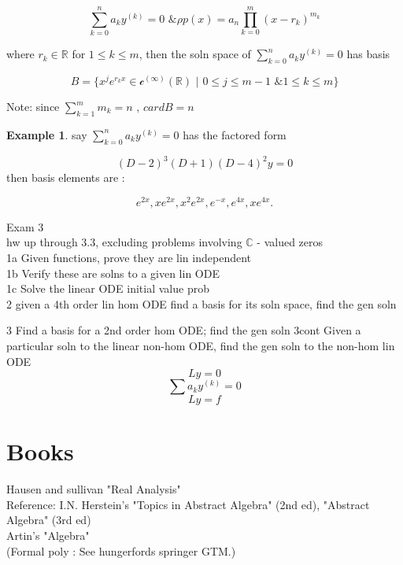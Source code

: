 \documentclass{article}
\theoremstyle{definition}
\newtheorem*{example}{Example}
\begin{document}
\[ \sum_{k=0}^{n}a_ky^{(k)} = 0 \text{ \& } \rho p(x) = a_n
\prod_{k=0}^m (x-r_k)^{m_k} \]

where \( r_k \in \mathbb{R} \) for \( 1 \leq k \leq m \), then the soln
space of \( \sum_{k=0}^{n} a_k y^{(k)} = 0 \) has basis 

\[ B = \{ x^j e^{r_kx} \in \mathscr{c}^{(\infty)} ( \mathbb{R})
\text{ | } 0 \leq j \leq m-1 \text{ \& } 1  \leq k \leq m \}\]

Note: since \( \sum_{k=1}^{m} m_k = n \text{ , } cardB=n \)

\begin{example}
  say \( \sum_{k=0}^{n}a_ky^{(k)} = 0 \) has the factored form 

  \[ (D-2)^3(D+1)(D-4)^2y= 0 \]
  then basis elements are : 

  \[ e^{2x}, xe^{2x}, x^2e^{2x}, e^{-x}, e^{4x}, xe^{4x}. \]

\end{example}

Exam 3\\ 
hw up through 3.3, excluding problems involving  \( \mathbb{C}  \) -
valued zeros \\

1a Given functions, prove they are lin independent\\ 
1b Verify these are solns to a given lin ODE \\ 
1c Solve the linear ODE  initial value prob \\

2 given a 4th order lin hom ODE find a basis for its soln space, find the
gen soln

3 Find a basis for a 2nd order hom ODE; find the gen soln 
3cont Given a particular soln to the linear non-hom ODE, find the gen
soln to the non-hom  lin ODE 
\[ Ly = 0  \]
\[ \sum a_k y^{(k)} = 0 \]
\[ Ly = f \]

\newpage
\section*{Books}
  Hausen and sullivan "Real Analysis" \\
  Reference: I.N. Herstein's "Topics in Abstract Algebra" (2nd ed),
  "Abstract Algebra" (3rd ed)\\
  Artin's "Algebra" \\
  (Formal poly : See hungerfords springer GTM.) \\










  
\end{document}
